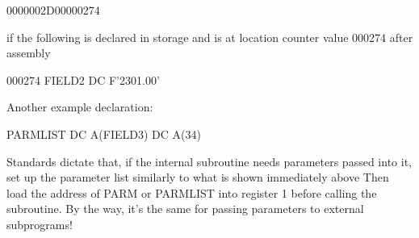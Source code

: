 \documentclass{report}
\begin{document}
\begin{itemize}
            \begin{center}
                0000002D00000274
            \end{center}
            if the following is declared in storage and is at location counter value 000274 after assembly
            \bigbreak \noindent 
            \begin{cppcode}
            000274 FIELD2 DC F'2301.00'
            \end{cppcode}
            \bigbreak \noindent 
            Another example declaration:
            \bigbreak \noindent 
            \begin{cppcode}
                PARMLIST DC A(FIELD3)
                         DC A(34)
            \end{cppcode}
            \bigbreak \noindent 
            Standards dictate that, if the internal subroutine needs parameters passed into it, set up the parameter list similarly to what is shown immediately above
            \bigbreak \noindent 
            Then load the address of PARM or PARMLIST into register 1 before calling the subroutine.
            \bigbreak \noindent 
            By the way, it's the same for passing parameters to external subprograms!
            

\end{itemize}
\end{document}
